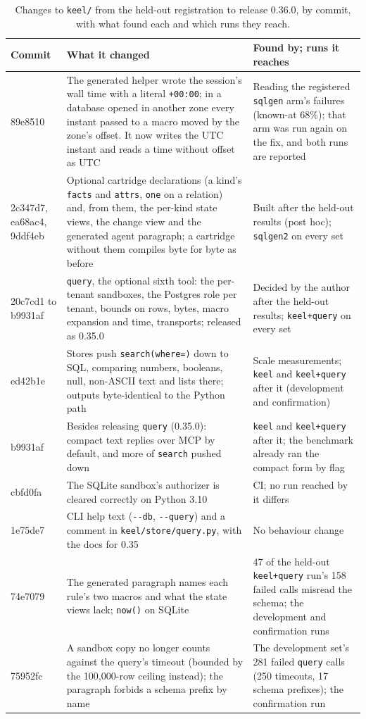\documentclass[sigconf, nonacm]{acmart}
\newcommand{\code}[1]{\texttt{#1}}
\begin{document}
\begin{table}[t]
\caption{Changes to \code{keel/} from the held-out registration to release 0.36.0, by commit, with what found each and which runs they reach.}
\label{tab:fixes-sets}
\centering
\footnotesize
\begin{tabularx}{\textwidth}{P{1.1in} L L}
\toprule
Commit & What it changed & Found by; runs it reaches \\
\midrule
89e8510 & The generated helper wrote the session's wall time with a literal \code{+00:00}; in a database opened in another zone every instant passed to a macro moved by the zone's offset. It now writes the UTC instant and reads a time without offset as UTC & Reading the registered \code{sqlgen} arm's failures (known-at 68\%); that arm was run again on the fix, and both runs are reported \\
\addlinespace
2c347d7, ea68ac4, 9ddf4eb & Optional cartridge declarations (a kind's \code{facts} and \code{attrs}, \code{one} on a relation) and, from them, the per-kind state views, the change view and the generated agent paragraph; a cartridge without them compiles byte for byte as before & Built after the held-out results (post hoc); \code{sqlgen2} on every set \\
\addlinespace
20c7cd1 to b9931af & \code{query}, the optional sixth tool: the per-tenant sandboxes, the Postgres role per tenant, bounds on rows, bytes, macro expansion and time, transports; released as 0.35.0 & Decided by the author after the held-out results; \code{keel+query} on every set \\
\addlinespace
ed42b1e & Stores push \code{search(where=)} down to SQL, comparing numbers, booleans, null, non-ASCII text and lists there; outputs byte-identical to the Python path & Scale measurements; \code{keel} and \code{keel+query} after it (development and confirmation) \\
\addlinespace
b9931af & Besides releasing \code{query} (0.35.0): compact text replies over MCP by default, and more of \code{search} pushed down & \code{keel} and \code{keel+query} after it; the benchmark already ran the compact form by flag \\
\addlinespace
cbfd0fa & The SQLite sandbox's authorizer is cleared correctly on Python 3.10 & CI; no run reached by it differs \\
\addlinespace
1e75de7 & CLI help text (\code{-{}-db}, \code{-{}-query}) and a comment in \code{keel/store/query.py}, with the docs for 0.35 & No behaviour change \\
\addlinespace
74e7079 & The generated paragraph names each rule's two macros and what the state views lack; \code{now()} on SQLite & 47 of the held-out \code{keel+query} run's 158 failed calls misread the schema; the development and confirmation runs \\
\addlinespace
75952fc & A sandbox copy no longer counts against the query's timeout (bounded by the 100,000-row ceiling instead); the paragraph forbids a schema prefix by name & The development set's 281 failed \code{query} calls (250 timeouts, 17 schema prefixes); the confirmation run \\
\bottomrule
\end{tabularx}
\end{table}
\end{document}
